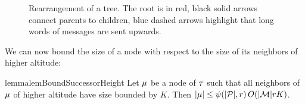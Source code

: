 \begin{figure}[t]
	
	\caption{Rearrangement of a tree. The root is in red, black solid arrows connect parents to children, blue dashed arrows highlight that long words of messages are sent upwards.}
	\label{fig:rearrange-tree}
\end{figure}

We can now bound the size of a node with respect to the size of its neighbors of higher altitude:

\begin{restatable}{lemma}{lemBoundSuccessorHeight}
	\label{lem:bound-successor-height}
	Let $\mu$ be a node of $\tau$ such that all neighbors of $\mu$ of higher altitude have size bounded by $K$.
	Then $|\mu| \leq \psi(|\mathcal{P}|, r) \, O(|\mathcal{M}| r K)$. 
		
\end{restatable}


		
